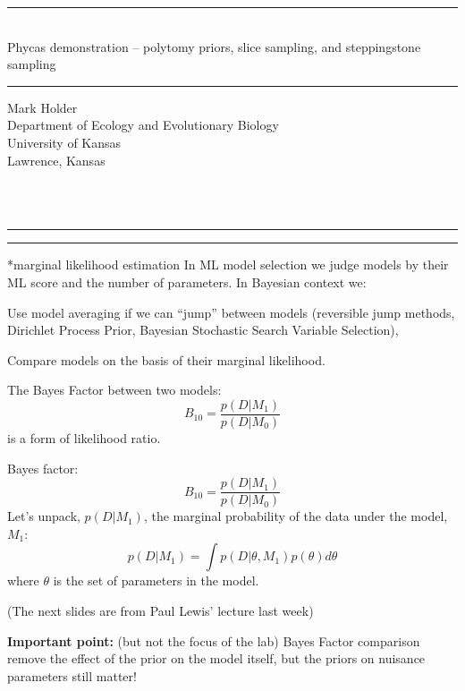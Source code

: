\documentclass[landscape]{foils}
\newcommand{\section}{\secdef \newsection\newsection}
\newcommand{\newsection}[1]{%
{
	\par\flushleft\large\sf\bfseries \vskip -2cm #1\\\rule[0.7\baselineskip]{\textwidth}{0.5mm}\par}}
\newcommand{\myBackground}{\begin{picture}(0,0)(0,0)  \put(-40,-70){\makebox(0,0)[l]{\texttt{[image: images/baby\_blue.jpg]}}} \end{picture}}
\newcommand{\myFooter}{}
\newcommand{\myNewSlide}{\newpage\myFooter} %
\renewcommand{\Pr}{p}
\begin{document}
\pagecolor{white}
\MyLogo{}
\unitlength=1mm


\begin{flushleft}
\begin{center}
\rule{\textwidth}{2mm}\\
{\LARGE Phycas demonstration -- polytomy priors, slice sampling, and steppingstone sampling \\}
\vskip 2mm
\rule[2mm]{\textwidth}{2mm}
\end{center}
\vskip 2cm
Mark Holder\\
Department of Ecology and Evolutionary Biology\\
University of Kansas\\
Lawrence, Kansas

\end{flushleft}


\myNewSlide
\section*{marginal likelihood estimation}
In ML model selection we judge models by their ML score and the number of parameters.
In Bayesian context we:
\begin{compactitem}
	\item Use model averaging if we can ``jump'' between models (reversible jump methods, Dirichlet Process Prior, Bayesian Stochastic Search Variable Selection),
	\item Compare models on the basis of their marginal likelihood.
\end{compactitem}

The Bayes Factor between two models:
\[B_{10} = \frac{\Pr(D|M_1)}{\Pr(D|M_0)}\]
 is a form of likelihood ratio.\\
\myNewSlide

\myNewSlide
Bayes factor:
\[B_{10} = \frac{\Pr(D|M_1)}{\Pr(D|M_0)}\]
\vskip 2cm
Let's unpack, $\Pr(D|M_1)$, the marginal probability of the data under the model, $M_1$:
\[\Pr(D|M_1) = \int\Pr(D|\theta, M_1)\Pr(\theta)d\theta \]
where $\theta$ is the set of parameters in the model.


{\small (The next slides are from Paul Lewis' lecture last week)}

 

\myNewSlide
 

\myNewSlide
{\bf Important point:} (but not the focus of the lab) Bayes Factor comparison remove the effect of the prior on the model itself, but the priors on nuisance parameters still matter!
\end{document}
